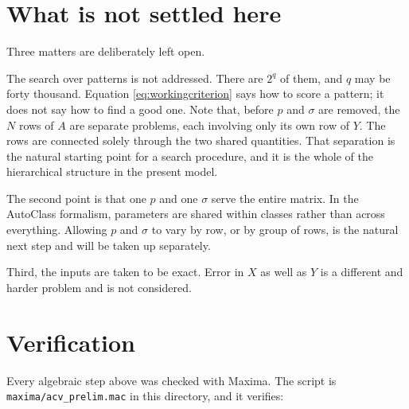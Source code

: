 \section{What is not settled here}

Three matters are deliberately left open.

The search over patterns is not addressed. There are $2^{q}$ of them, and $q$ may be
forty thousand. Equation \eqref{eq:workingcriterion} says how to score a pattern; it
does not say how to find a good one. Note that, before $p$ and $\sigma$ are removed,
the $N$ rows of $A$ are separate problems, each involving only its own row of $Y$.
The rows are connected solely through the two shared quantities. That separation is
the natural starting point for a search procedure, and it is the whole of the
hierarchical structure in the present model.

The second point is that one $p$ and one $\sigma$ serve the entire matrix. In the
AutoClass formalism, parameters are shared within classes rather than across
everything. Allowing $p$ and $\sigma$ to vary by row, or by group of rows, is the
natural next step and will be taken up separately.

Third, the inputs are taken to be exact. Error in $X$ as well as $Y$ is a different
and harder problem and is not considered.

\section{Verification}

Every algebraic step above was checked with Maxima. The script is
\texttt{maxima/acv\_prelim.mac} in this directory, and it verifies:

